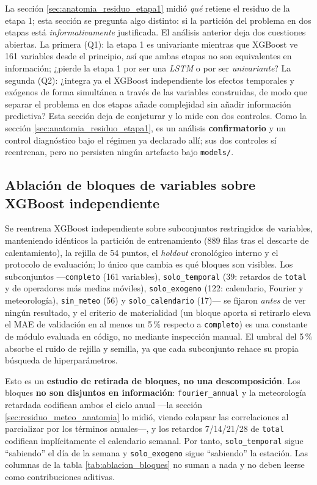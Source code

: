 La sección \ref{sec:anatomia_residuo_etapa1} midió \emph{qué} retiene el residuo de la
etapa 1; esta sección se pregunta algo distinto: si la partición del problema en dos etapas
está \emph{informativamente} justificada. El análisis anterior deja dos cuestiones
abiertas. La primera (Q1): la etapa 1 es univariante mientras que
XGBoost ve 161 variables desde el principio, así que ambas etapas no son equivalentes en
información; ¿pierde la etapa 1 por ser una \emph{LSTM} o por ser \emph{univariante}? La
segunda (Q2): ¿integra ya el XGBoost independiente los efectos temporales y exógenos de forma
simultánea a través de las variables construidas, de modo que separar el problema en dos
etapas añade complejidad sin añadir información predictiva? Esta sección deja de conjeturar
y lo mide con dos controles. Como la sección \ref{sec:anatomia_residuo_etapa1}, es un
análisis \textbf{confirmatorio} y un control diagnóstico bajo el régimen ya declarado allí;
sus dos controles sí reentrenan, pero no persisten ningún artefacto bajo \texttt{models/}.

\subsection{Ablación de bloques de variables sobre XGBoost independiente}\label{sec:ablacion_bloques}

Se reentrena XGBoost independiente sobre subconjuntos restringidos de variables,
manteniendo idénticos la partición de entrenamiento (889 filas tras el descarte de
calentamiento), la rejilla de 54 puntos, el \emph{holdout} cronológico interno y el
protocolo de evaluación; lo único que cambia es qué bloques son visibles. Los subconjuntos
—\texttt{completo} (161 variables), \texttt{solo\_temporal} (39: retardos de \texttt{total}
y de operadores más medias móviles), \texttt{solo\_exogeno} (122: calendario, Fourier y
meteorología), \texttt{sin\_meteo} (56) y \texttt{solo\_calendario} (17)— se fijaron
\emph{antes} de ver ningún resultado, y el criterio de materialidad (un bloque aporta si
retirarlo eleva el MAE de validación en al menos un 5\,\% respecto a \texttt{completo}) es
una constante de módulo evaluada en código, no mediante inspección manual. El umbral del 5\,\% absorbe el ruido
de rejilla y semilla, ya que cada subconjunto rehace su propia búsqueda de
hiperparámetros.

Esto es un \textbf{estudio de retirada de bloques, no una descomposición}. Los bloques
\textbf{no son disjuntos en información}: \texttt{fourier\_annual} y la meteorología
retardada codifican ambos el ciclo anual —la sección \ref{sec:residuo_meteo_anatomia} lo
midió, viendo colapsar las correlaciones al parcializar por los términos anuales—, y los
retardos 7/14/21/28 de \texttt{total} codifican implícitamente el calendario semanal. Por
tanto, \texttt{solo\_temporal} sigue ``sabiendo'' el día de la semana y \texttt{solo\_exogeno}
sigue ``sabiendo'' la estación. Las columnas de la tabla \ref{tab:ablacion_bloques} no
suman a nada y no deben leerse como contribuciones aditivas.


